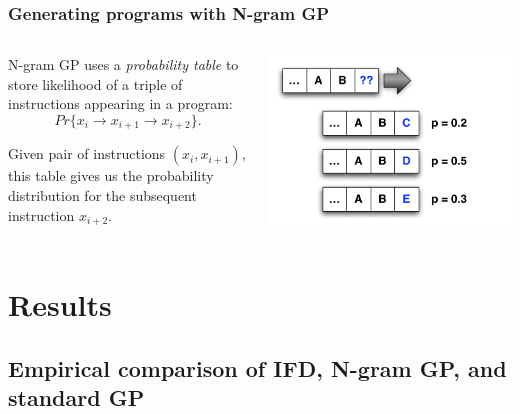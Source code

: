 \documentclass{beamer}
\begin{document}
\begin{frame}
	\frametitle{Generating programs with N-gram GP}
	
	\begin{columns}
	\begin{column}{0.45\textwidth}
	N-gram GP uses a \emph{probability table} to store likelihood of a triple of instructions appearing in a program:
	\[ Pr\{ x_i \rightarrow x_{i+1} \rightarrow x_{i+2} \}. \]
				
		Given pair of instructions $(x_i, x_{i+1})$, this table gives us the probability distribution for the subsequent instruction $x_{i+2}$.
	\end{column}
	\begin{column}{0.55\textwidth}
	\includegraphics[width=\textwidth]{N_gram_figures/ThreeChoices_v2.pdf}
	\end{column}
	\end{columns}
\end{frame}

\section[Results]{Results}

\subsection[Empirical results]{Empirical comparison of IFD, N-gram GP, and standard GP}
\end{document}
